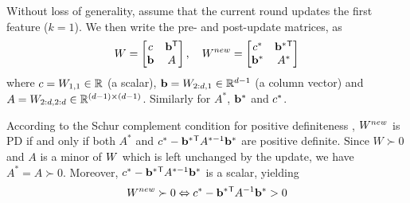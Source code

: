 \documentclass{article}
\begin{document}
Without loss of generality, assume that the current round updates
the first feature ($k = 1$).  We then write the pre- and post-update
matrices, as
\begin{equation}
  {W} = \left[ \begin{matrix} c & \mathbf{b}{}^\mathsf{T} \\ \mathbf{b} & A \end{matrix} \right],
  \quad
  {{W^{new}}} = \left[ \begin{matrix} c^* & \mathbf{b}^*{}^\mathsf{T} \\ \mathbf{b}^* & A^* \end{matrix} \right]
  \label{schurNotationPreUpdate}
\end{equation}
 where $c = {W}_{1,1} \in \mathbb{R}$ (a scalar), $\mathbf{b} = {W}_{2:d,1} \in
\mathbb{R}^{d-1}$ (a column vector) and $A = {W}_{2:d,2:d} \in \mathbb{R}^{(d-1)
\times (d-1)}$. Similarly for $A^*$, $\mathbf{b}^*$ and $c^*$.


According to the Schur complement condition for positive definiteness
\citep[p. 650]{boyd2004convex}, ${{W^{new}}}$ is PD if and only if both
$A^*$ and $c^* - \mathbf{b}^*{}^\mathsf{T} A^{*-1} \mathbf{b}^*$ are positive definite.
Since $W \succ 0$ and $A$ is a minor of ${W}$ which is left unchanged by the update, we have $A^* =
A \succ 0$.  Moreover, $c^* - \mathbf{b}^*{}^\mathsf{T} A^{*-1} \mathbf{b}^*$ is a
scalar, yielding
\begin{equation}
  {{W^{new}}} \succ  0 \Leftrightarrow  c^* - \mathbf{b}^*{}^\mathsf{T} A^{-1} \mathbf{b}^* >  0
  \label{schurCond}
\end{equation}
%
\end{document}

